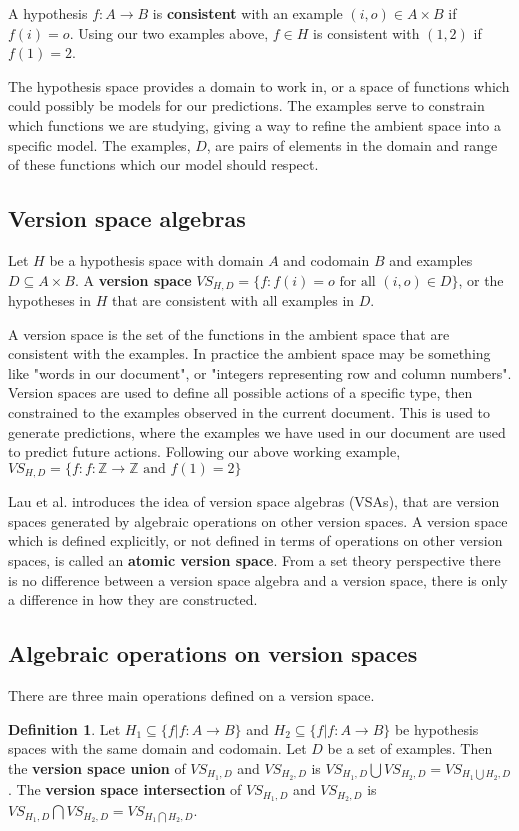 \documentclass{article}
\theoremstyle{definition}
\newtheorem{definition}{Definition}[section]
\begin{document}
A hypothesis $f: A\rightarrow B$ is \textbf{consistent} with an example $(i,o) \in A\times B$ if $f(i) = o$. Using our two examples above, $f\in H $ is consistent with $(1,2)$ if $f(1) = 2$. 

The hypothesis space provides a domain to work in, or a space of functions which could possibly be models for our predictions. The examples serve to constrain which functions we are studying, giving a way to refine the ambient space into a specific model.  The examples, $D$, are pairs of elements in the domain and range of these functions which our model should respect. 


\subsection{Version space algebras}
Let $H$ be a hypothesis space with domain $A$ and codomain $B$ and examples $D \subseteq A \times B$. A \textbf{version space} $VS_{H,D} = \{f : f(i) = o \text{ for all } (i,o) \in D\}$, or the hypotheses in $H$ that are consistent with all examples in $D$. 

A version space is the set of the functions in the ambient space that are consistent with the examples. In practice the ambient space may be something like "words in our document", or "integers representing row and column numbers".  Version spaces are used to define all possible actions of a specific type, then constrained to the examples observed in the current document. This is used to generate predictions, where the examples we have used in our document are used to predict future actions.
Following our above working example, $VS_{H,D} = \{f : f: \mathbb{Z} \rightarrow \mathbb{Z} \text{ and } f(1) = 2\}$

Lau et al.\cite{short} introduces the idea of version space algebras (VSAs), that are version spaces generated by algebraic operations on other version spaces. A version space which is defined explicitly, or not defined in terms of operations on other version spaces, is called an \textbf{atomic version space}. From a set theory perspective there is no difference between a version space algebra and a version space, there is only a difference in how they are constructed. 

\subsection{Algebraic operations on version spaces}
There are three main operations defined on a version space. 
\begin{definition}
    Let $H_1 \subseteq \{f | f: A \rightarrow B\}$ and $H_2 \subseteq \{f | f: A \rightarrow B\}$ be hypothesis spaces with the same domain and codomain. Let $D$ be a set of examples. Then the \textbf{version space union} of $VS_{H_1, D}$ and $VS_{H_2, D}$ is $VS_{H_1, D} \bigcup VS_{H_2, D} = VS_{H_1\bigcup H_2, D}$. The \textbf{version space intersection} of $VS_{H_1, D}$ and $VS_{H_2, D}$ is $VS_{H_1, D} \bigcap VS_{H_2, D} = VS_{H_1\bigcap H_2, D}$.
\end{definition}
\end{document}
